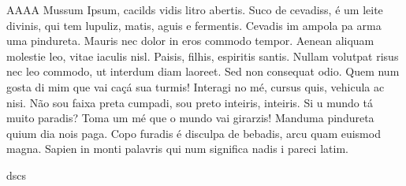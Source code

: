 AAAA Mussum Ipsum, cacilds vidis litro abertis. Suco de cevadiss, é um
leite divinis, qui tem lupuliz, matis, aguis e fermentis. Cevadis im
ampola pa arma uma pindureta. Mauris nec dolor in eros commodo tempor.
Aenean aliquam molestie leo, vitae iaculis nisl. Paisis, filhis,
espiritis santis. Nullam volutpat risus nec leo commodo, ut interdum
diam laoreet. Sed non consequat odio. Quem num gosta di mim que vai caçá
sua turmis! Interagi no mé, cursus quis, vehicula ac nisi. Não sou faixa
preta cumpadi, sou preto inteiris, inteiris. Si u mundo tá muito
paradis? Toma um mé que o mundo vai girarzis! Manduma pindureta quium
dia nois paga. Copo furadis é disculpa de bebadis, arcu quam euismod
magna. Sapien in monti palavris qui num significa nadis i pareci latim.

dscs
